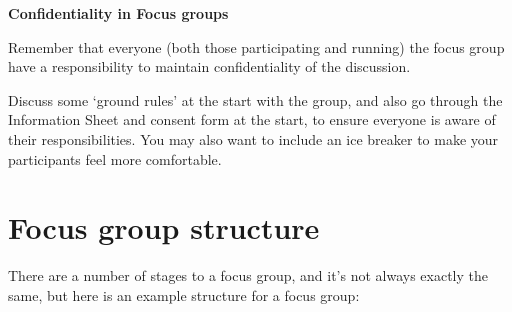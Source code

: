 \documentclass[
  english,
  letterpaper,
  DIV=11,
  numbers=noendperiod]{scrreprt}
\begin{document}
\textbf{Confidentiality in Focus groups}

Remember that everyone (both those participating and running) the focus
group have a responsibility to maintain confidentiality of the
discussion.

Discuss some `ground rules' at the start with the group, and also go
through the Information Sheet and consent form at the start, to ensure
everyone is aware of their responsibilities. You may also want to
include an ice breaker to make your participants feel more comfortable.

\section{Focus group structure}\label{focus-group-structure}

There are a number of stages to a focus group, and it's not always
exactly the same, but here is an example structure for a focus group:
\end{document}
